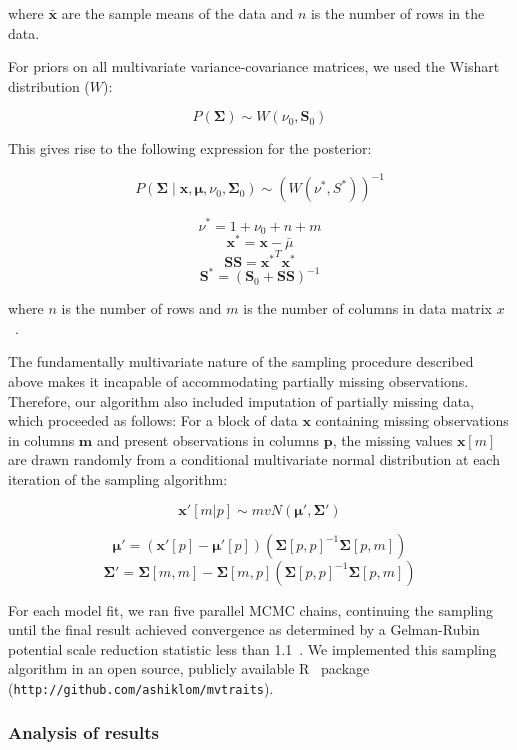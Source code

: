 where ${\bar{{\mathbf{x}}}}$ are the sample means of the data and $n$ is the number of rows in the data.

For priors on all multivariate variance-covariance matrices, we used the Wishart distribution ($W$):

\[P(\mathbf{\Sigma}) \sim W(\nu_0, \mathbf{S}_0)\]

This gives rise to the following expression for the posterior:

\[P(\mathbf{\Sigma} \mid
  \mathbf{x}, \mathbf{\mu},
  \nu_0, \mathbf{\Sigma}_0)
  \sim
  {(W(\nu^*, S^*))}^{-1}\]

\[\nu^* = 1 + \nu_0 + n + m\]
\[\mathbf{x^*} = \mathbf{x} - \bar{\mu}\]
\[\mathbf{SS} = \mathbf{x^*}^{T} \mathbf{x^*}\]
\[\mathbf{S^*} = {(\mathbf{S}_0 + \mathbf{SS})}^{-1}\]

where $n$ is the number of rows and $m$ is the number of columns in data matrix $x$~\cite[full derivation in][]{gelman_bayesian}.

The fundamentally multivariate nature of the sampling procedure described above makes it incapable of accommodating partially missing observations.
Therefore, our algorithm also included imputation of partially missing data, which proceeded as follows:
For a block of data $\mathbf{x}$ containing missing observations in columns $\mathbf{m}$ and present observations in columns $\mathbf{p}$,
the missing values $\mathbf{x}[m]$ are drawn randomly from a conditional multivariate normal distribution at each iteration of the sampling algorithm:

\[\mathbf{x'}[m|p] \sim mvN(\mathbf{\mu}', \mathbf{\Sigma}')\]

\[\mathbf{\mu'} = 
  (\mathbf{x'}[p] - \mathbf{\mu'}[p]) 
  ({\mathbf{\Sigma}[p,p]}^{-1} \mathbf{\Sigma}[p,m])\]
\[\mathbf{\Sigma'} = \mathbf{\Sigma}[m,m] - 
  \mathbf{\Sigma}[m,p]
  ({\mathbf{\Sigma}[p,p]}^{-1} \mathbf{\Sigma}[p,m])\]

For each model fit, we ran five parallel MCMC chains, continuing the sampling until the final result achieved convergence as determined by a Gelman-Rubin potential scale reduction statistic less than 1.1~\cite{gelman_1992_inference}.
We implemented this sampling algorithm in an open source, publicly available R~\cite[version 3.4.3,][]{rstats} package (\texttt{http://github.com/ashiklom/mvtraits}).


\subsubsection{Analysis of results}

